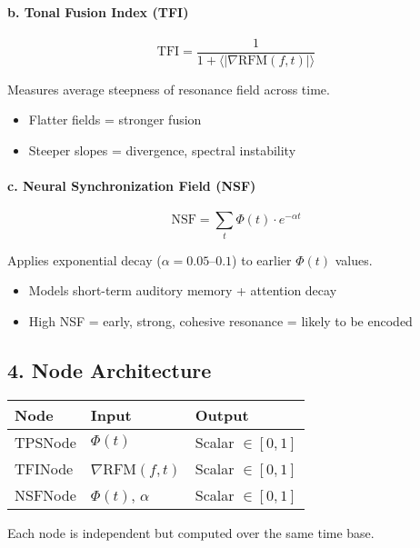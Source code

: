 \documentclass{article}
\begin{document}
\paragraph{b. Tonal Fusion Index (TFI)}

\[
\text{TFI} = \frac{1}{1 + \langle |\nabla \text{RFM}(f, t)| \rangle}
\]

Measures average steepness of resonance field across time.

\begin{itemize}
    \item Flatter fields = stronger fusion
    \item Steeper slopes = divergence, spectral instability
\end{itemize}

\paragraph{c. Neural Synchronization Field (NSF)}

\[
\text{NSF} = \sum_t \Phi(t) \cdot e^{-\alpha t}
\]

Applies exponential decay ($\alpha = 0.05$–$0.1$) to earlier $\Phi(t)$ values.

\begin{itemize}
    \item Models short-term auditory memory + attention decay
    \item High NSF = early, strong, cohesive resonance = likely to be encoded
\end{itemize}

\subsection*{4. Node Architecture}

\begin{center}
\begin{tabular}{|l|l|l|}
\hline
\textbf{Node} & \textbf{Input} & \textbf{Output} \\
\hline
TPSNode & $\Phi(t)$ & Scalar $\in [0, 1]$ \\
TFINode & $\nabla$RFM$(f, t)$ & Scalar $\in [0, 1]$ \\
NSFNode & $\Phi(t)$, $\alpha$ & Scalar $\in [0, 1]$ \\
\hline
\end{tabular}
\end{center}

Each node is independent but computed over the same time base.
\end{document}

